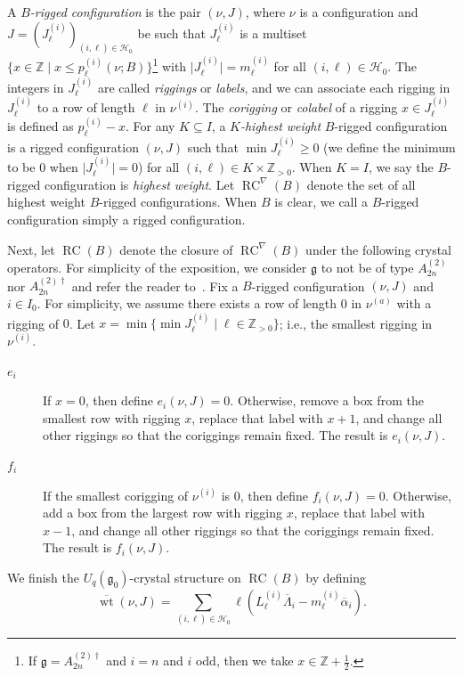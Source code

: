 \documentclass[reqno]{amsart}
\newcommand{\g}{\mathfrak{g}}
\newcommand{\HH}{\mathcal{H}}
\newcommand{\clfw}{\overline{\Lambda}} %
\newcommand{\clsr}{\overline{\alpha}} %
\newcommand{\inner}[2]{\left\langle #1, #2 \right\rangle}
\DeclareMathOperator{\RC}{RC} %
\DeclareMathOperator{\wt}{wt} %
\newcommand{\hwRC}{\RC^{\nabla}} %
\newcommand{\ZZ}{\mathbb{Z}}
\newcommand{\defn}[1]{{\color{darkred}\emph{#1}}} %
\theoremstyle{plain}
\theoremstyle{definition}
\numberwithin{equation}{section}
\begin{document}
A \defn{$B$-rigged configuration} is the pair $(\nu, J)$, where $\nu$ is a configuration and $J = (J_{\ell}^{(i)})_{(i,\ell) \in \HH_0}$ be such that $J_{\ell}^{(i)}$ is a multiset $\{x \in \ZZ \mid x \leq p_{\ell}^{(i)}(\nu; B) \}$\footnote{If $\g = A_{2n}^{(2)\dagger}$ and $i = n$ and $i$ odd, then we take $x \in \ZZ + \frac{1}{2}$.} with $\lvert J_{\ell}^{(i)} \rvert = m_{\ell}^{(i)}$ for all $(i, \ell) \in \HH_0$.
The integers in $J_{\ell}^{(i)}$ are called \defn{riggings} or \defn{labels}, and we can associate each rigging in $J_{\ell}^{(i)}$ to a row of length $\ell$ in $\nu^{(i)}$.
The \defn{corigging} or \defn{colabel} of a rigging $x \in J_{\ell}^{(i)}$ is defined as $p_{\ell}^{(i)} - x$.
For any $K \subseteq I$, a \defn{$K$-highest weight} $B$-rigged configuration is a rigged configuration $(\nu, J)$ such that $\min J_{\ell}^{(i)} \geq 0$ (we define the minimum to be $0$ when $\lvert J_{\ell}^{(i)} \rvert = 0$) for all $(i, \ell) \in K \times \ZZ_{>0}$.
When $K = I$, we say the $B$-rigged configuration is \defn{highest weight}.
Let $\hwRC(B)$ denote the set of all highest weight $B$-rigged configurations.
When $B$ is clear, we call a $B$-rigged configuration simply a rigged configuration.

Next, let $\RC(B)$ denote the closure of $\hwRC(B)$ under the following crystal operators.
For simplicity of the exposition, we consider $\g$ to not be of type $A_{2n}^{(2)}$ nor $A_{2n}^{(2)\dagger}$ and refer the reader to~\cite[Def.~3.1]{SchillingS15}.
Fix a $B$-rigged configuration $(\nu, J)$ and $i \in I_0$.
For simplicity, we assume there exists a row of length $0$ in $\nu^{(a)}$ with a rigging of $0$.
Let $x = \min \{ \min J_{\ell}^{(i)} \mid \ell \in \ZZ_{>0} \}$; i.e., the smallest rigging in $\nu^{(i)}$.
\begin{description}
\item[\defn{$e_i$}] If $x = 0$, then define $e_i(\nu, J) = 0$.
Otherwise, remove a box from the smallest row with rigging $x$, replace that label with $x + 1$, and change all other riggings so that the coriggings remain fixed.
The result is $e_i(\nu, J)$.

\item[\defn{$f_i$}] If the smallest corigging of $\nu^{(i)}$ is $0$, then define $f_i(\nu, J) = 0$.
Otherwise, add a box from the largest row with rigging $x$, replace that label with $x - 1$, and change all other riggings so that the coriggings remain fixed.
The result is $f_i(\nu, J)$.
\end{description}
We finish the $U_q(\g_0)$-crystal structure on $\RC(B)$ by defining
\[
\overline{\wt}(\nu, J) = \sum_{(i, \ell) \in \HH_0} \ell \left( L_{\ell}^{(i)} \clfw_i - m_{\ell}^{(i)} \clsr_i \right).
\]
\end{document}

